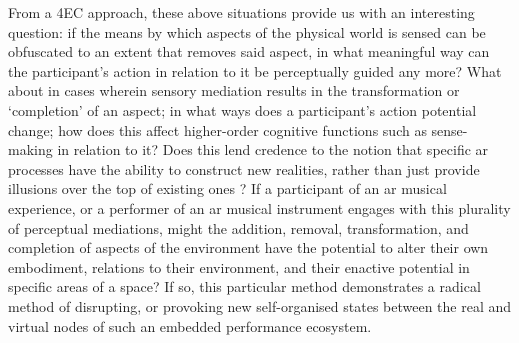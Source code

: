 From a 4EC approach, these above situations provide us with an interesting question: if the means by which aspects of the physical world is sensed can be obfuscated to an extent that removes said aspect, in what meaningful way can the participant's action in relation to it be perceptually guided any more? What about in cases wherein sensory mediation results in the transformation or `completion' of an aspect; in what ways does a participant's action potential change; how does this affect higher-order cognitive functions such as sense-making in relation to it? Does this lend credence to the notion that specific \gls{ar} processes have the ability to construct new realities, rather than just provide illusions over the top of existing ones \citep[p. 230]{chalmers2022}? If a participant of an \gls{ar} musical experience, or a performer of an \gls{ar} musical instrument engages with this plurality of perceptual mediations, might the addition, removal, transformation, and completion of aspects of the environment have the potential to alter their own embodiment, relations to their environment, and their enactive potential in specific areas of a space? If so, this particular method demonstrates a radical method of disrupting, or provoking new self-organised states between the real and virtual nodes of such an embedded performance ecosystem.

